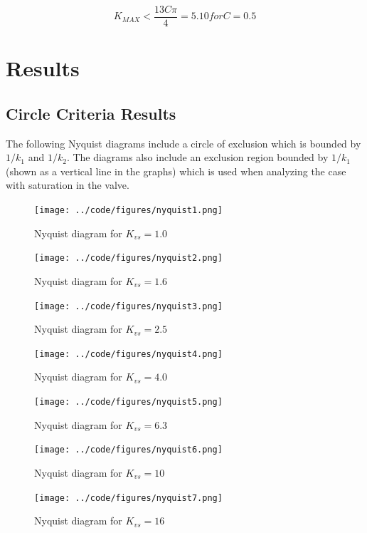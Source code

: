 \documentclass[a4paper, titlepage]{article}
\begin{document}
\begin{equation}
K_{MAX} < \frac{13C\pi}{4} = 5.10 for C=0.5
\label{equ:maximum_k}
\end{equation}

\section{Results}

\subsection{Circle Criteria Results}
The following Nyquist diagrams include a circle of exclusion which is bounded by $1/k_{1}$ and $1/k_{2}$.  The diagrams also include an exclusion region bounded by $1/k_{1}$ (shown as a vertical line in the graphs) which is used when analyzing the case with saturation in the valve.

\begin{figure}[h!]
\center
\texttt{[image: ../code/figures/nyquist1.png]}
\caption{Nyquist diagram for $K_{vs}=1.0$}
\label{fig:nyquist1}
\end{figure}

\begin{figure}[h!]
\center
\texttt{[image: ../code/figures/nyquist2.png]}
\caption{Nyquist diagram for $K_{vs}=1.6$}
\label{fig:nyquist2}
\end{figure}

\begin{figure}[h!]
\center
\texttt{[image: ../code/figures/nyquist3.png]}
\caption{Nyquist diagram for $K_{vs}=2.5$}
\label{fig:nyquist3}
\end{figure}

\begin{figure}[h!]
\center
\texttt{[image: ../code/figures/nyquist4.png]}
\caption{Nyquist diagram for $K_{vs}=4.0$}
\label{fig:nyquist4}
\end{figure}

\begin{figure}[h!]
\center
\texttt{[image: ../code/figures/nyquist5.png]}
\caption{Nyquist diagram for $K_{vs}=6.3$}
\label{fig:nyquist5}
\end{figure}

\begin{figure}[h!]
\center
\texttt{[image: ../code/figures/nyquist6.png]}
\caption{Nyquist diagram for $K_{vs}=10$}
\label{fig:nyquist6}
\end{figure}

\begin{figure}[h!]
\center
\texttt{[image: ../code/figures/nyquist7.png]}
\caption{Nyquist diagram for $K_{vs}=16$}
\label{fig:nyquist7}
\end{figure}
\end{document}

